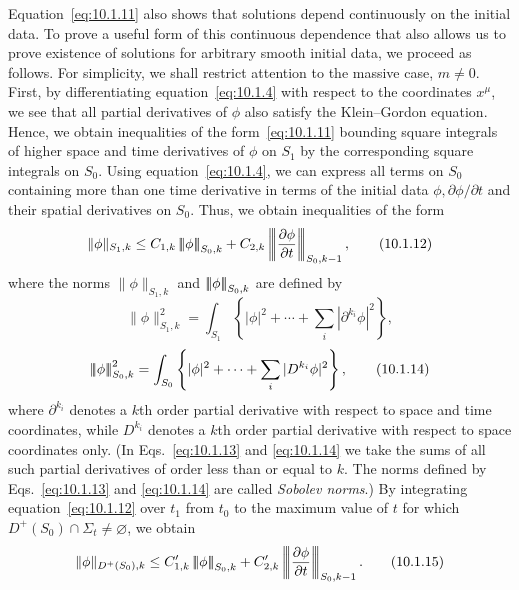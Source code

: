 Equation~\eqref{eq:10.1.11} also shows that solutions depend continuously on the
initial data. To prove a useful form of this continuous dependence that also allows us
to prove existence of solutions for arbitrary smooth initial data, we proceed as follows.
For simplicity, we shall restrict attention to the massive case, \(m\ne0\). First, by
differentiating equation~\eqref{eq:10.1.4} with respect to the coordinates \(x^\mu\),
we see that all partial derivatives of \(\phi\) also satisfy the Klein--Gordon equation.
Hence, we obtain inequalities of the form~\eqref{eq:10.1.11} bounding square
integrals of higher space and time derivatives of \(\phi\) on \(S_1\) by the
corresponding square integrals on \(S_0\). Using equation~\eqref{eq:10.1.4}, we
can express all terms on \(S_0\) containing more than one time derivative in terms
of the initial data \(\phi,\partial\phi/\partial t\) and their spatial derivatives on
\(S_0\). Thus, we obtain inequalities of the form
\begin{equation}
  \lVert\phi\rVert_{S_1,k}
  \leq C_{1,k}\triplenorm{\phi}_{S_0,k}
  +C_{2,k}\triplenorm{\frac{\partial\phi}{\partial t}}_{S_0,k-1},
  \tag{10.1.12}\label{eq:10.1.12}
\end{equation}
where the norms \(\lVert\phi\rVert_{S_1,k}\) and
\(\left\lvert\!\left\lvert\!\left\lvert \phi \right\rvert\!\right\rvert\!\right\rvert_{S_0,k}\) are defined by
\begin{equation}
  \lVert\phi\rVert_{S_1,k}^2
  =\int_{S_1}\left\{|\phi|^2+\cdots+
    \sum_i|\partial^{k_i}\phi|^2\right\},
  \tag{10.1.13}\label{eq:10.1.13}
\end{equation}
\begin{equation}
  \left\lvert\!\left\lvert\!\left\lvert \phi \right\rvert\!\right\rvert\!\right\rvert_{S_0,k}^2
  =\int_{S_0}\left\{|\phi|^2+\cdots+
    \sum_i|D^{k_i}\phi|^2\right\},
  \tag{10.1.14}\label{eq:10.1.14}
\end{equation}
where \(\partial^{k_i}\) denotes a \(k\)th order partial derivative with respect to
space and time coordinates, while \(D^{k_i}\) denotes a \(k\)th order partial
derivative with respect to space coordinates only. (In
Eqs.~\eqref{eq:10.1.13} and \eqref{eq:10.1.14} we take the sums of all such
partial derivatives of order less than or equal to \(k\). The norms defined by
Eqs.~\eqref{eq:10.1.13} and \eqref{eq:10.1.14} are called \emph{Sobolev norms}.)
By integrating equation~\eqref{eq:10.1.12} over \(t_1\) from \(t_0\) to the
maximum value of \(t\) for which \(D^+(S_0)\cap\Sigma_t\ne\varnothing\), we obtain
\begin{equation}
  \lVert\phi\rVert_{D^+(S_0),k}
  \leq C'_{1,k}\triplenorm{\phi}_{S_0,k}
  +C'_{2,k}\triplenorm{\frac{\partial\phi}{\partial t}}_{S_0,k-1}.
  \tag{10.1.15}\label{eq:10.1.15}
\end{equation}

